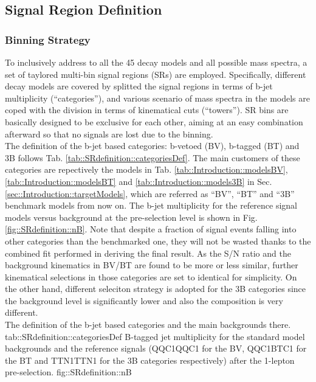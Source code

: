 \subsection{Signal Region Definition}
\subsubsection{Binning Strategy}
To inclusively address to all the 45 decay models and all possible mass spectra, a set of taylored multi-bin signal regions (SRs) are employed.
Specifically, different decay models are covered by splitted the signal regions in terms of b-jet multiplicity (``categories''), 
and various scenario of mass spectra in the models are coped with the division in terms of kinematical cuts (``towers''). 
SR bins are basically designed to be exclusive for each other, aiming at an easy combination afterward so that no signals are lost due to the binning. \\

The definition of the b-jet based categories: b-vetoed (BV), b-tagged (BT) and 3B follows Tab. \ref{tab::SRdefinition::categoriesDef}. The main customers of these categories are repectively the models in Tab. \ref{tab::Introduction::modelsBV}, \ref{tab::Introduction::modelsBT} and \ref{tab::Introduction::models3B} in Sec. \ref{sec::Introduction::targetModels}, which are referred as ``BV'', ``BT'' and ``3B'' benchmark models from now on. 
The b-jet multiplicity for the reference signal models versus background at the pre-selection level is shown in Fig. \ref{fig::SRdefinition::nB}.
Note that despite a fraction of signal events falling into other categories than the benchmarked one, they will not be wasted thanks to the combined fit performed in deriving the final result.
As the S/N ratio and the background kinematics in BV/BT are found to be more or less similar, further kinematical selections in those categories are set to identical for simplicity. 
On the other hand, different seleciton strategy is adopted for the 3B categories since the background level is significantly lower and also the composition is very different. \\

{The definition of the b-jet based categories and the main backgrounds there.}
{tab::SRdefinition::categoriesDef}
{B-tagged jet multiplicity for the standard model backgrounds and the reference signals (QQC1QQC1 for the BV, QQC1BTC1 for the BT and TTN1TTN1 for the 3B categories respectively) after the 1-lepton pre-selection.}
{fig::SRdefinition::nB}


